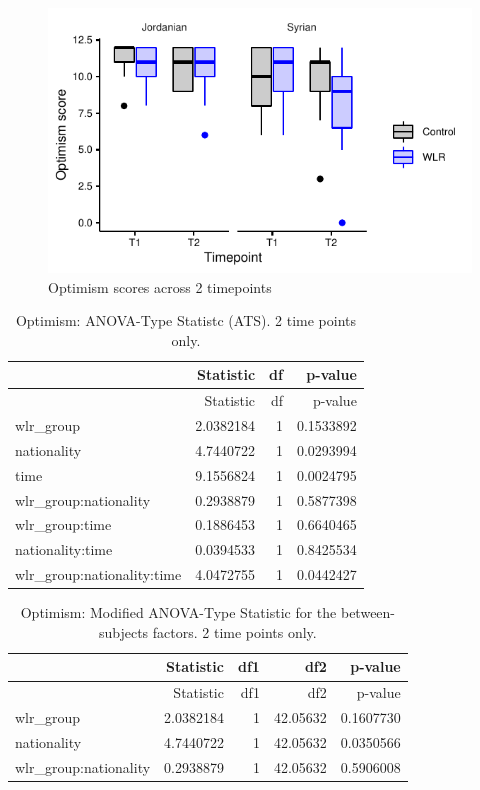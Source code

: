 \documentclass[]{article}
\begin{document}
\begin{figure}[H]

{\centering \includegraphics{WLR-analyses-report_files/figure-latex/unnamed-chunk-28-1} 

}

\caption{Optimism scores across 2 timepoints}\label{fig:unnamed-chunk-28}
\end{figure}

\begin{longtable}[]{@{}lrrr@{}}
\caption{Optimism: ANOVA-Type Statistc (ATS). 2 time points
only.}\tabularnewline
\toprule
& Statistic & df & p-value\tabularnewline
\midrule
\endfirsthead
\toprule
& Statistic & df & p-value\tabularnewline
\midrule
\endhead
wlr\_group & 2.0382184 & 1 & 0.1533892\tabularnewline
nationality & 4.7440722 & 1 & 0.0293994\tabularnewline
time & 9.1556824 & 1 & 0.0024795\tabularnewline
wlr\_group:nationality & 0.2938879 & 1 & 0.5877398\tabularnewline
wlr\_group:time & 0.1886453 & 1 & 0.6640465\tabularnewline
nationality:time & 0.0394533 & 1 & 0.8425534\tabularnewline
wlr\_group:nationality:time & 4.0472755 & 1 & 0.0442427\tabularnewline
\bottomrule
\end{longtable}

\begin{longtable}[]{@{}lrrrr@{}}
\caption{Optimism: Modified ANOVA-Type Statistic for the
between-subjects factors. 2 time points only.}\tabularnewline
\toprule
& Statistic & df1 & df2 & p-value\tabularnewline
\midrule
\endfirsthead
\toprule
& Statistic & df1 & df2 & p-value\tabularnewline
\midrule
\endhead
wlr\_group & 2.0382184 & 1 & 42.05632 & 0.1607730\tabularnewline
nationality & 4.7440722 & 1 & 42.05632 & 0.0350566\tabularnewline
wlr\_group:nationality & 0.2938879 & 1 & 42.05632 &
0.5906008\tabularnewline
\bottomrule
\end{longtable}
\end{document}
